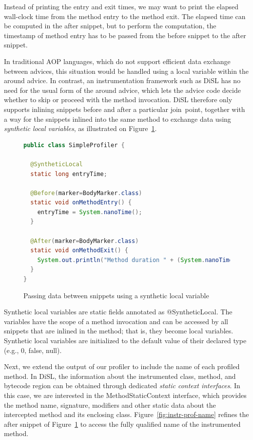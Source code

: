 \documentclass{article}
\newcommand{\brcode}[1]{\textsf{#1}}
\newcommand{\code}[1]{\mbox{\brcode{#1}}}
\begin{document}
\medskip

Instead of printing the entry and exit times, we may want to print the elapsed wall-clock time from the method entry to the method exit.
The elapsed time can be computed in the after snippet, but to perform the computation, the timestamp of method entry has to be passed from the before snippet to the after snippet.

In traditional AOP languages, which do not support efficient data exchange between advices, this situation would be handled using a local variable within the around advice.
In contrast, an instrumentation framework such as DiSL has no need for the usual form of the around advice, which lets the advice code decide whether to skip or proceed with the method invocation.
DiSL therefore only supports inlining snippets before and after a particular join~point, together with a way for the snippets inlined into the same method to exchange data using \emph{synthetic local variables}, as illustrated on Figure~\ref{fig:instr-prof-time}.

\begin{figure}[h!]
\smaller
\begin{lstlisting}[language=Java]
public class SimpleProfiler {

  @SyntheticLocal
  static long entryTime;

  @Before(marker=BodyMarker.class)
  static void onMethodEntry() {
    entryTime = System.nanoTime();
  }

  @After(marker=BodyMarker.class)
  static void onMethodExit() {
    System.out.println("Method duration " + (System.nanoTime() - entryTime));
  }
}
\end{lstlisting}
\caption{Passing data between snippets using a synthetic local variable}
\label{fig:instr-prof-time}
\end{figure}

Synthetic local variables are static fields annotated as \code{@SyntheticLocal}.
The variables have the scope of a method invocation and can be accessed by all snippets that are inlined in the method; that is, they become local variables.
Synthetic local variables are initialized to the default value of their declared type (e.g., \code{0}, \code{false}, \code{null}).

\medskip

Next, we extend the output of our profiler to include the name of each profiled method.
In DiSL, the information about the instrumented class, method, and bytecode region can be obtained through dedicated \emph{static context interfaces}.
In this case, we are interested in the \code{MethodStaticContext} interface, which provides the method name, signature, modifiers and other static data about the intercepted method and its enclosing class.
Figure~\ref{fig:instr-prof-name} refines the after snippet of Figure~\ref{fig:instr-prof-time} to access the fully qualified name of the instrumented method.
\end{document}
